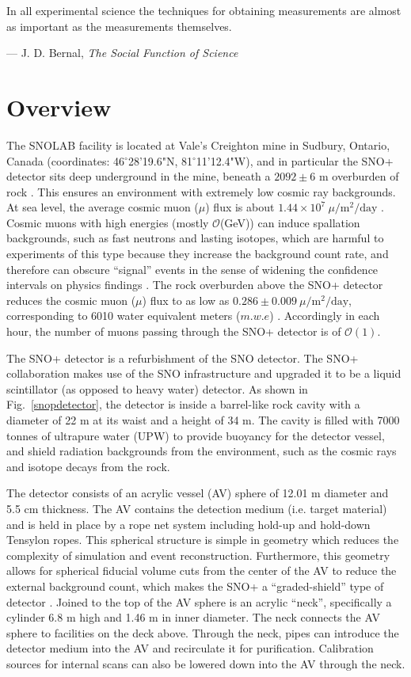 \setlength{\epigraphwidth}{0.5\textwidth}
\epigraph{In all experimental science the techniques for obtaining measurements are almost as important as the measurements themselves.}{--- \textup{J. D. Bernal}, \textit{The Social Function of Science}}

\section{Overview}\label{sect:overview}

The SNOLAB facility is located at Vale's Creighton mine in Sudbury, Ontario, Canada (coordinates: 46$^\circ$28'19.6"N, 81$^\circ$11'12.4"W), and in particular the SNO+ detector sits deep underground in the mine, beneath a $2092\pm6$ m overburden of rock \cite{snop_jinst,snolabuserhandbook}. This ensures an environment with extremely low cosmic ray backgrounds. At sea level, the average cosmic muon ($\mu$) flux is about $1.44\times 10^7~\mu/\mathrm{m^2/day}$ \cite{muonflux}. Cosmic muons with high energies (mostly $\mathcal{O}$(GeV)) can induce spallation backgrounds, such as fast neutrons and lasting isotopes, which are harmful to experiments of this type because they increase the background count rate, and therefore can obscure ``signal'' events in the sense of widening the confidence intervals on physics findings \cite{beacom2017physics}. The rock overburden above the SNO+ detector reduces the cosmic muon ($\mu$) flux to as low as $0.286\pm0.009~\mu/\mathrm{m^2/day}$, corresponding to 6010 water equivalent meters ($m.w.e$) \cite{snop_jinst}. Accordingly in each hour, the number of muons passing through the SNO+ detector is of $\mathcal{O}(1)$.

The SNO+ detector is a refurbishment of the SNO detector. The SNO+ collaboration makes use of the SNO infrastructure and upgraded it to be a liquid scintillator (as opposed to heavy water) detector. As shown in Fig.~\ref{snopdetector}, the detector is inside a barrel-like rock cavity with a diameter of 22 m at its waist and a height of 34 m. The cavity is filled with 7000 tonnes of ultrapure water (UPW) to provide buoyancy for the detector vessel, and shield radiation backgrounds from the environment, such as the cosmic rays and isotope decays from the rock.

The detector consists of an acrylic vessel (AV) sphere of 12.01 m diameter and 5.5 cm thickness. The AV contains the detection medium (i.e. target material) and is held in place by a rope net system including hold-up and hold-down Tensylon ropes. This spherical structure is simple in geometry which reduces the complexity of simulation and event reconstruction. Furthermore, this geometry allows for spherical fiducial volume cuts from the center of the AV to reduce the external background count, which makes the SNO+ a ``graded-shield'' type of detector \cite{waterfield2017optical}. Joined to the top of the AV sphere is an acrylic ``neck'', specifically a cylinder 6.8 m high and 1.46 m in inner diameter. The neck connects the AV sphere to facilities on the deck above. Through the neck, pipes can introduce the detector medium into the AV and recirculate it for purification. Calibration sources for internal scans can also be lowered down into the AV through the neck.

